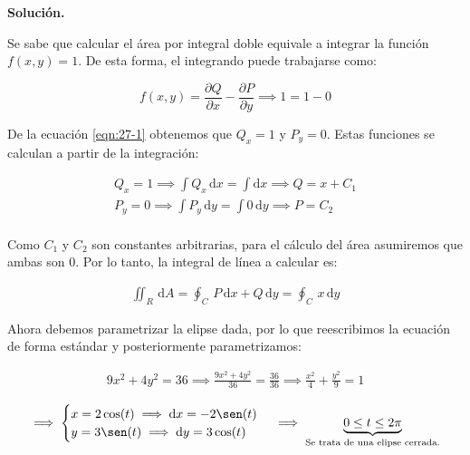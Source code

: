 \documentclass[12pt]{article}
\begin{document}
\vspace{5mm}

\noindent \textbf{Solución.}

\vspace{3mm}

\noindent Se sabe que calcular el área por integral doble equivale a integrar la función $f(x, y) = 1$. De esta forma, el integrando puede trabajarse como:

\begin{equation}\label{eqn:27-1}\tag{1}
	f(x, y) = \frac{\partial Q}{\partial x} - \frac{\partial P}{\partial y} \implies 1 = 1 - 0
\end{equation}

\noindent De la ecuación \eqref{eqn:27-1} obtenemos que $Q_x = 1$ y $P_y = 0$. Estas funciones se calculan a partir de la integración:

\begin{align*}
	Q_x = 1 \implies \int Q_x\, \mathrm{d}x = \int \mathrm{d}x \implies Q = x + C_1 \\
	P_y = 0 \implies \int P_y\, \mathrm{d}y = \int 0\, \mathrm{d}y \implies P = C_2 \\
\end{align*}

\noindent Como $C_1$ y $C_2$ son constantes arbitrarias, para el cálculo del área asumiremos que ambas son 0. Por lo tanto, la integral de línea a calcular es:

\begin{align*}
	\iint_R\,\mathrm{d}A = \oint_C\, P\,\mathrm{d}x + Q\,\mathrm{d}y = \oint_C\, x\, \mathrm{d}y
\end{align*}

\noindent Ahora debemos parametrizar la elipse dada, por lo que reescribimos la ecuación de forma estándar y posteriormente parametrizamos:

\begin{align*}
	9x^2 + 4y^2 = 36 \implies \frac{9x^2 + 4y^2}{36} = \frac{36}{36} \implies \frac{x^2}{4} + \frac{y^2}{9} = 1
\end{align*}

\begin{align*}
	\implies \begin{cases}
		x = 2\cos(t) \implies \mathrm{d}x = -2\sen(t)\\
		y = 3\sen(t) \implies \mathrm{d}y = 3\cos(t)\\
	\end{cases} \implies \underbrace{0 \leq t \leq 2\pi}_{\text{Se trata de una elipse cerrada.}}
\end{align*}
\end{document}
